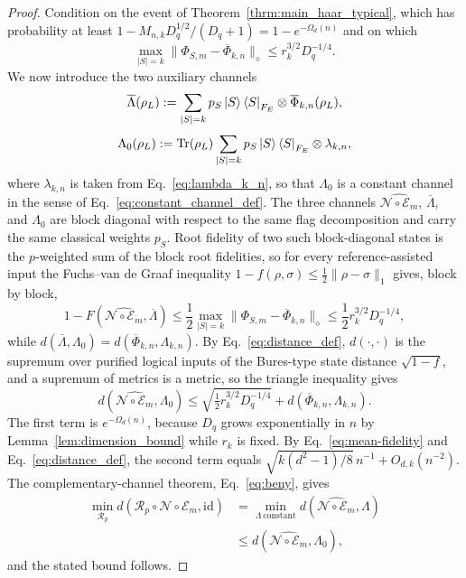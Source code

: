 \documentclass[10pt,twocolumn,superscriptaddress,aps,amsmath,amssymb,citeautoscript,floatfix,prx]{revtex4-2}
\theoremstyle{plain}
\theoremstyle{plain}
\theoremstyle{plain}
\theoremstyle{plain}
\theoremstyle{plain}
\theoremstyle{plain}
\theoremstyle{plain}
\theoremstyle{definition}
\theoremstyle{plain}
\begin{document}
\begin{proof}
Condition on the event of Theorem~\ref{thrm:main_haar_typical}, which has probability at least $1-M_{n,k}D_q^{1/2}/(D_q+1)=1-e^{-\Omega_d(n)}$ and on which
$$
\max_{|S|=k}\|\Phi_{S,m}-\overline\Phi_{k,n}\|_\diamond
\le
r_k^{3/2}D_q^{-1/4}.
$$
We now introduce the two auxiliary channels
$$
\overline\Lambda(\rho_L)
:=
\sum_{|S|=k}
p_S
\ket S\bra S_{F_E}
\otimes
\overline\Phi_{k,n}(\rho_L),
$$
$$
\Lambda_0(\rho_L)
:=
\operatorname{Tr}(\rho_L)
\sum_{|S|=k}
p_S
\ket S\bra S_{F_E}
\otimes
\lambda_{k,n},
$$
where $\lambda_{k,n}$ is taken from Eq.~\eqref{eq:lambda_k_n}, so that $\Lambda_0$ is a constant channel 
in the sense of Eq.~\eqref{eq:constant_channel_def}. The three channels $\widehat{\mathcal N\circ\mathcal E_m}$, 
$\overline\Lambda$, and $\Lambda_0$ are block diagonal with respect to the same flag decomposition and carry the same classical weights $p_S$. 
Root fidelity of two such block-diagonal states is the $p$-weighted sum of the block root fidelities, 
so for every reference-assisted input the Fuchs--van de Graaf inequality $1-f(\rho,\sigma)\le\frac12\|\rho-\sigma\|_1$ gives, block by block,
$$
    1-F\left(\widehat{\mathcal N\circ\mathcal E_m},\overline\Lambda\right)
    \le
    \frac12
    \max_{|S|=k}
    \|\Phi_{S,m}-\overline\Phi_{k,n}\|_\diamond
    \le
    \frac12r_k^{3/2}D_q^{-1/4},
$$
while $d(\overline\Lambda,\Lambda_0)=d(\overline\Phi_{k,n},\Lambda_{k,n})$. By Eq.~\eqref{eq:distance_def}, $d(\cdot,\cdot)$ is the supremum over purified logical inputs 
of the Bures-type state distance $\sqrt{1-f}$, and a supremum of metrics is a metric, so the triangle inequality gives
$$
    d\left(\widehat{\mathcal N\circ\mathcal E_m},\Lambda_0\right)
    \le
    \sqrt{\tfrac12r_k^{3/2}D_q^{-1/4}}
    +
    d\left(\overline\Phi_{k,n},\Lambda_{k,n}\right).
$$
The first term is $e^{-\Omega_d(n)}$, because $D_q$ grows exponentially in $n$ by Lemma~\ref{lem:dimension_bound} while $r_k$ is fixed. By Eq.~\eqref{eq:mean-fidelity} and Eq.~\eqref{eq:distance_def}, the second term equals $\sqrt{k(d^2-1)/8}\,n^{-1}+O_{d,k}(n^{-2})$. 
The complementary-channel theorem, Eq.~\eqref{eq:beny}, gives
\begin{align*}
    \min_{\mathcal R_p}
    d\left(\mathcal R_p\circ\mathcal N\circ\mathcal E_m,\mathrm{id}\right)
    &=
    \min_{\Lambda\,\mathrm{constant}}
    d\left(\widehat{\mathcal N\circ\mathcal E_m},\Lambda\right)\\
    &\le
    d\left(\widehat{\mathcal N\circ\mathcal E_m},\Lambda_0\right),
\end{align*}
and the stated bound follows.
\end{proof}
\end{document}
